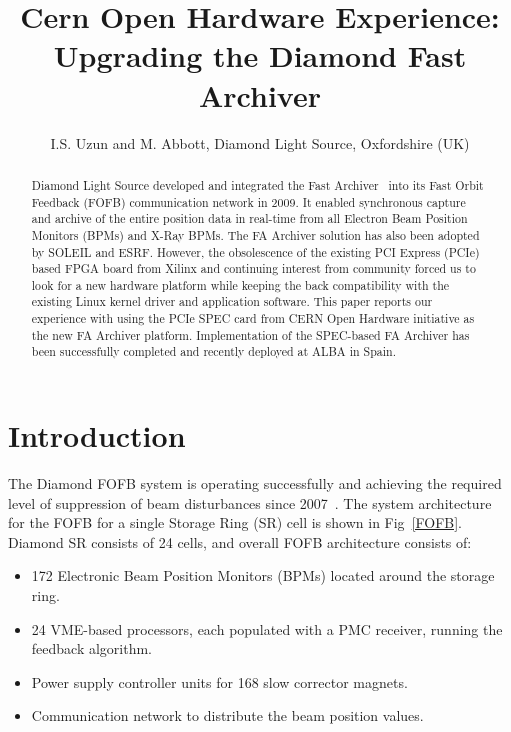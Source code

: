 \documentclass[a4paper,
              ]{jacow}
\begin{document}
\title{Cern Open Hardware Experience: Upgrading the Diamond Fast Archiver}

\author{I.S. Uzun and M. Abbott, Diamond Light Source, Oxfordshire (UK)}

\maketitle

%
\begin{abstract}
Diamond Light Source developed and integrated the Fast Archiver~\cite{ARCHIVER} into its Fast Orbit Feedback (FOFB) communication network in 2009. It enabled synchronous capture and archive of the entire position data in real-time from all Electron Beam Position Monitors (BPMs) and X-Ray BPMs. The FA Archiver solution has also been adopted by SOLEIL and ESRF. However, the obsolescence of the existing PCI Express (PCIe) based FPGA board from Xilinx and continuing interest from community forced us to look for a new hardware platform while keeping the back compatibility with the existing Linux kernel driver and application software. This paper reports our experience with using the PCIe SPEC card from CERN Open Hardware initiative as the new FA Archiver platform. Implementation of the SPEC-based FA Archiver has been successfully completed and recently deployed at ALBA in Spain.
\end{abstract}

\section{Introduction}
The Diamond FOFB system is operating successfully and achieving the required level of suppression of beam disturbances since 2007~\cite{FOFB}. The system architecture for the FOFB for a single Storage Ring (SR) cell is shown in Fig~\ref{FOFB}. Diamond SR consists of 24 cells, and overall FOFB architecture consists of: 

\begin{itemize}
\setlength\itemsep{0em}
\item 172 Electronic Beam Position Monitors (BPMs) located around the storage ring.
\item 24 VME-based processors, each populated with a PMC receiver, running the feedback algorithm.
\item Power supply controller units for 168 slow corrector magnets.
\item Communication network to distribute the beam position values.
\end{itemize}
\end{document}
